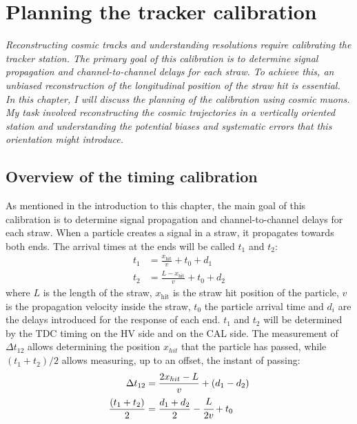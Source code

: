 \chapter{Planning the tracker calibration}
\textit{Reconstructing cosmic tracks and understanding resolutions require calibrating the tracker station. 
The primary goal of this calibration is to determine signal propagation and channel-to-channel 
delays for each straw. To achieve this, an unbiased reconstruction of the longitudinal position of the straw 
hit is essential. In this chapter, I will discuss the planning of the calibration using cosmic muons. My task 
involved reconstructing the cosmic trajectories in a vertically oriented station and understanding the potential 
biases and systematic errors that this orientation might introduce. }
\section{Overview of the timing calibration}
As mentioned in the introduction to this chapter, the main goal of this calibration is to determine signal propagation and channel-to-channel delays for each straw.
When a particle creates a signal in a straw, it propagates towards both ends. 
The arrival times at the ends will be called $t_1$ and $t_2$:
\begin{equation}
\begin{aligned}
    t_1 &= \frac{x_{\text{hit}}}{v} + t_0 + d_1 \\
    t_2 &= \frac{L - x_{\text{hit}}}{v} + t_0 + d_2
\end{aligned}
\end{equation}
where $L$ is the length of the straw, $x_{\text{hit}}$ is the straw hit position 
of the particle, $v$ is the propagation velocity inside the straw, $t_0$ the particle arrival time and $d_i$ 
are the delays introduced for the response of each end. $t_1$ and $t_2$ will be determined by the TDC timing on the HV side and on the CAL side.
The measurement of $\Delta t_{12}$ allows determining the position $x_{hit}$ that the particle has passed, 
while $(t_1 + t_2) / 2$ allows measuring, up to an offset, the instant of passing:
\begin{equation}\label{ffffff}
    \begin{aligned}
        \Delta t_{12} &= \frac{2x_{hit}-L}{v} +(d_1-d_2)  \\
        \frac{(t_1 + t_2)}{2} &= \frac{d_1+d_2}{2}-\cfrac{L}{2v}+t_0 
    \end{aligned}
    \end{equation}
